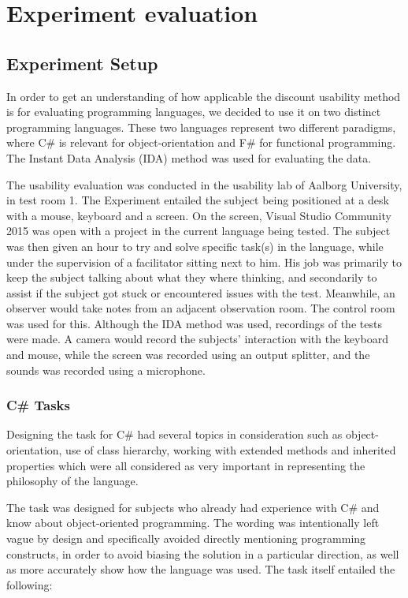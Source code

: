\chapter{Experiment evaluation}
\label{chapter:ExperimentEvaluation}


\section{Experiment Setup}
In order to get an understanding of how applicable the discount usability method is for evaluating programming languages, we decided to use it on two distinct programming languages. These two languages represent two different paradigms, where C\# is relevant for object-orientation and F\# for functional programming. The Instant Data Analysis (IDA) method\cite{IDA} was used for evaluating the data.

The usability evaluation was conducted in the usability lab of Aalborg University\cite{UsabilityLab}, in test room 1.
The Experiment entailed the subject being positioned at a desk with a mouse, keyboard and a screen.
On the screen, Visual Studio Community 2015 was open with a project in the current language being tested.
The subject was then given an hour to try and solve specific task(s) in the language, while under the supervision of a facilitator sitting next to him. His job was primarily to keep the subject talking about what they where thinking, and secondarily to assist if the subject got stuck or encountered issues with the test.
Meanwhile, an observer would take notes from an adjacent observation room. The control room was used for this.
Although the IDA method was used, recordings of the tests were made.
A camera would record the subjects' interaction with the keyboard and mouse, while the screen was recorded using an output splitter, and the sounds was recorded using a microphone.

\subsection{C\# Tasks}
\label{subsection:C Task}
Designing the task for C\# had several topics in consideration such as object-orientation, use of class hierarchy, working with extended methods and inherited properties which were all considered as very important in representing the philosophy of the language.  

The task was designed for subjects who already had experience with C\# and know about object-oriented programming.
The wording was intentionally left vague by design and specifically avoided directly mentioning programming constructs, in order to avoid biasing the solution in a particular direction, as well as more accurately show how the language was used. The task itself entailed the following:

